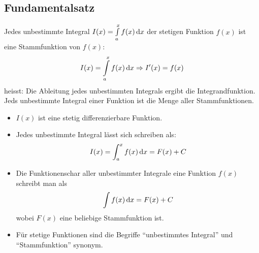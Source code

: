\subsection{Fundamentalsatz}
Jedes unbestimmte Integral $I(x) = \int\limits_{a}^{x} f(x) \,\mathrm dx$ der stetigen Funktion $f(x)$ ist eine Stammfunktion von $f(x)$:
\begin{equation*}
	I(x) = \int\limits_{a}^{x} f(x) \,\mathrm dx \Rightarrow I'(x) = f(x)
\end{equation*}
heisst: Die Ableitung jedes unbestimmten Integrals ergibt die Integrandfunktion. Jeds unbestimmte Integral einer Funktion ist die Menge
aller Stammfunktionen.

\begin{itemize}\itemsep0em
	\item $I(x)$ ist eine stetig differenzierbare Funktion.
	\item Jedes unbestimmte Integral lässt sich schreiben als:
	\begin{equation*}
		I(x) = \int_{a}^{x} f(x) \,\mathrm dx = F(x) + C
	\end{equation*}
	\item Die Funktionenschar aller unbestimmter Integrale eine Funktion $f(x)$ schreibt man als
	\begin{equation*}
		\int f(x) \,\mathrm dx = F(x) + C
	\end{equation*}
	wobei $F(x)$ eine beliebige Stammfunktion ist.
	\item Für stetige Funktionen sind die Begriffe \enquote{unbestimmtes Integral} und \enquote{Stammfunktion} synonym.
\end{itemize}



